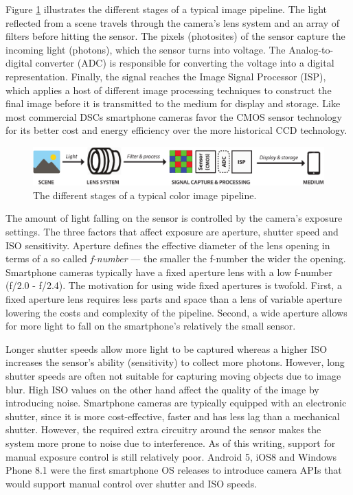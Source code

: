 \documentclass[thesis.tex]{subfiles}
\begin{document}
Figure \ref{figure:pipeline} illustrates the different stages of a typical image pipeline. The light reflected from a scene travels through the camera's lens system and an array of filters before hitting the sensor. The pixels (photosites) of the sensor capture the incoming light (photons), which the sensor turns into voltage. The Analog-to-digital converter (ADC) is responsible for converting the voltage into a digital representation. Finally, the signal reaches the Image Signal Processor (ISP), which applies a host of different image processing techniques to construct the final image before it is transmitted to the medium for display and storage. Like most commercial DSCs smartphone cameras favor the CMOS sensor technology for its better cost and energy efficiency over the more historical CCD technology.

\begin{figure}[h]
\centering \includegraphics[width=\textwidth]{images/pipeline}
\caption{The different stages of a typical color image pipeline.\label{figure:pipeline}}
\end{figure}

The amount of light falling on the sensor is controlled by the camera's exposure settings. The three factors that affect exposure are aperture, shutter speed and ISO sensitivity. Aperture defines the effective diameter of the lens opening in terms of a so called \textit{f-number} --- the smaller the f-number the wider the opening. Smartphone cameras typically have a fixed aperture lens with a low f-number (f/2.0 - f/2.4). The motivation for using wide fixed apertures is twofold. First, a fixed aperture lens requires less parts and space than a lens of variable aperture lowering the costs and complexity of the pipeline. Second, a wide aperture allows for more light to fall on the smartphone's relatively the small sensor.

Longer shutter speeds allow more light to be captured whereas a higher ISO increases the sensor's ability (sensitivity) to collect more photons. However, long shutter speeds are often not suitable for capturing moving objects due to image blur. High ISO values on the other hand affect the quality of the image by introducing noise. Smartphone cameras are typically equipped with an electronic shutter, since it is more cost-effective, faster and has less lag than a mechanical shutter. However, the required extra circuitry around the sensor makes the system more prone to noise due to interference. As of this writing, support for manual exposure control is still relatively poor. Android 5, iOS8 and Windows Phone 8.1 were the first smartphone OS releases to introduce camera APIs that would support manual control over shutter and ISO speeds.
\end{document}

